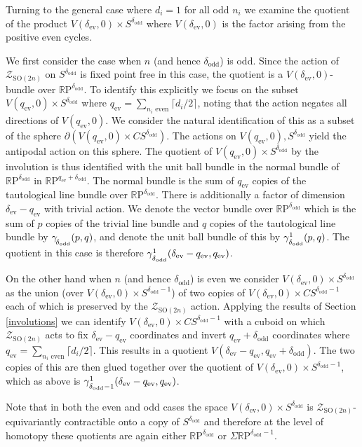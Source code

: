 \documentclass[11pt,a4paper]{article}
\def\SO{\mathrm{SO}}
\def\R{\mathbb{R}}
\def\cZ{\mathcal{Z}}
\def\RP{\R\mathrm{P}}
\def\cZ{{\mathcal Z}}
\def\ev{\mathrm{ev}}
\def\odd{\mathrm{odd}}
\def\ZDSO{\cZ_{\SO(2n)}}
\def\bundle#1#2#3{{\gamma\!\strut_{#1}(#2,#3)}}
\def\unitbundle#1#2#3{{\gamma^1\!\!\!\strut_{#1}(#2,#3)}}
\begin{document}
Turning to the general case where $d_i=1$ for all odd $n_i$ we examine the quotient of the product $V(\delta_\ev,0)\times S^{\delta_\odd}$ where $V(\delta_\ev,0)$ is the factor arising from the positive even cycles.

We first consider the case when $n$ (and hence ${\delta_\odd}$) is odd. Since the action of $\ZDSO$ on $S^{\delta_\odd}$ is fixed point free in this case, the quotient is a $V(\delta_\ev,0)$-bundle over $\RP^{\delta_\odd}$. To identify this explicitly we focus on the subset $V(q_\ev,0)\times S^{\delta_\odd}$ where $q_\ev=\sum\limits_{n_i \text{ even}} \lceil d_i/2\rceil$, noting that the action negates all directions of $V(q_\ev,0)$. We consider the natural identification of this as a subset of the sphere $\partial (V(q_\ev,0)\times CS^{\delta_\odd})$. The actions on $V(q_\ev,0), S^{\delta_\odd}$ yield the antipodal action on this sphere. The quotient of $V(q_\ev,0)\times S^{\delta_\odd}$ by the involution is thus identified with the unit ball bundle in the normal bundle of $\RP^{\delta_\odd}$ in $\RP^{q_\ev+\delta_\odd}$. The normal bundle is the sum of $q_\ev$ copies of the tautological line bundle over $\RP^{\delta_\odd}$. There is additionally a factor of dimension $\delta_\ev-q_\ev$ with trivial action.
We denote the vector bundle over $\RP^{\delta_\odd}$ which is the sum of $p$ copies of the trivial line bundle and $q$ copies of the tautological line bundle by $\bundle{\delta_\odd}pq$, and denote the unit ball bundle of this by $\unitbundle{\delta_\odd}pq$. The quotient in this case is therefore $\unitbundle{\delta_\odd}{\delta_\ev-q_\ev}{q_\ev}$.


On the other hand when $n$ (and hence ${\delta_\odd}$) is even we consider  $V(\delta_\ev,0)\times S^{\delta_\odd}$ as the union (over $V(\delta_\ev,0)\times S^{{\delta_\odd}-1}$) of two copies of $V(\delta_\ev,0)\times C S^{{\delta_\odd}-1}$ each of which is preserved by the $\ZDSO$ action. Applying the results of Section \ref{involutions} we can identify $V(\delta_\ev,0)\times C S^{{\delta_\odd}-1}$ with a cuboid on which $\ZDSO$ acts to fix $\delta_\ev-q_\ev$ coordinates and invert $q_\ev+{\delta_\odd}$ coordinates where $q_\ev=\sum\limits_{n_i \text{ even}} \lceil d_i/2\rceil$. This results in a quotient $V(\delta_\ev-q_\ev, q_\ev+\delta_\odd)$. The two copies of this are then glued together over the quotient of $V(\delta_\ev,0)\times S^{{\delta_\odd}-1}$, which as above is $\unitbundle{\delta_\odd-1}{\delta_\ev-q_\ev}{q_\ev}$.


Note that in both the even and odd cases the space $V(\delta_\ev,0)\times S^{{\delta_\odd}}$ is $\ZDSO$-equivariantly contractible onto a copy of $S^{\delta_\odd}$ and therefore at the level of homotopy these quotients are again either $\RP^{\delta_\odd}$ or $\Sigma\RP^{{\delta_\odd}-1}$.
\end{document}

